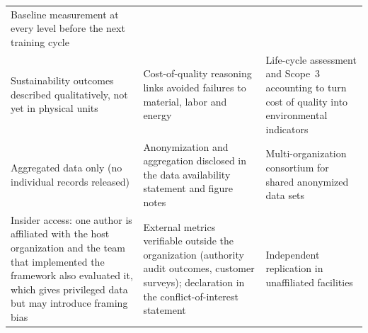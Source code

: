 \begin{table}[H]
\begin{tabularx}{\linewidth}{@{}>{\raggedright\arraybackslash}p{3.6cm} >{\raggedright\arraybackslash}X >{\raggedright\arraybackslash}X@{}}
    Baseline measurement at every level before the next training cycle \\
    \addlinespace
    Sustainability outcomes described qualitatively, not yet in physical units &
    Cost-of-quality reasoning links avoided failures to material, labor and energy &
    Life-cycle assessment and Scope~3 accounting to turn cost of quality into environmental indicators \\
    \addlinespace
    Aggregated data only (no individual records released) &
    Anonymization and aggregation disclosed in the data availability statement and figure notes &
    Multi-organization consortium for shared anonymized data sets \\
    \addlinespace
    Insider access: one author is affiliated with the host organization and the team that implemented the framework also evaluated it, which gives privileged data but may introduce framing bias &
    External metrics verifiable outside the organization (authority audit outcomes, customer surveys); declaration in the conflict-of-interest statement &
    Independent replication in unaffiliated \MRO{} facilities \\
    \bottomrule
  \end{tabularx}
\end{table}
